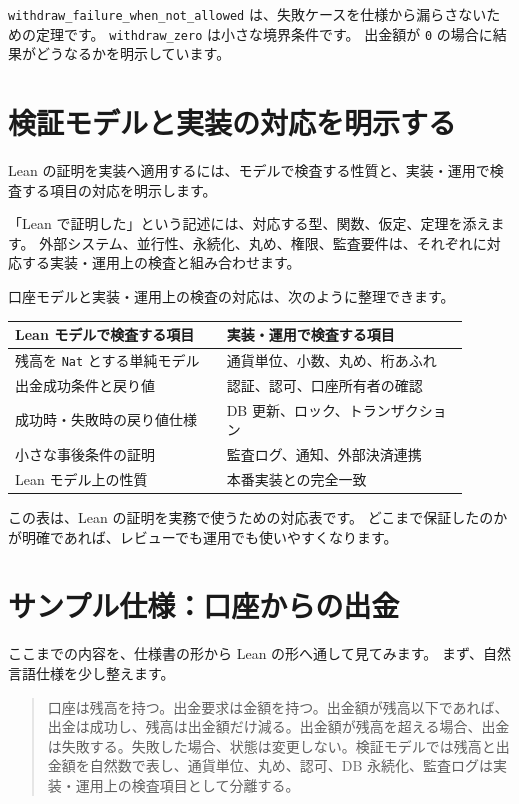 \texttt{withdraw\_failure\_when\_not\_allowed} は、失敗ケースを仕様から漏らさないための定理です。
\texttt{withdraw\_zero} は小さな境界条件です。
出金額が \texttt{0} の場合に結果がどうなるかを明示しています。

\section{検証モデルと実装の対応を明示する}

Lean の証明を実装へ適用するには、モデルで検査する性質と、実装・運用で検査する項目の対応を明示します。

「Lean で証明した」という記述には、対応する型、関数、仮定、定理を添えます。
外部システム、並行性、永続化、丸め、権限、監査要件は、それぞれに対応する実装・運用上の検査と組み合わせます。

口座モデルと実装・運用上の検査の対応は、次のように整理できます。

\begin{center}
\begin{tabular}{p{0.42\linewidth}p{0.48\linewidth}}
\toprule
Lean モデルで検査する項目 & 実装・運用で検査する項目 \\
\midrule
残高を \texttt{Nat} とする単純モデル & 通貨単位、小数、丸め、桁あふれ \\
出金成功条件と戻り値 & 認証、認可、口座所有者の確認 \\
成功時・失敗時の戻り値仕様 & DB 更新、ロック、トランザクション \\
小さな事後条件の証明 & 監査ログ、通知、外部決済連携 \\
Lean モデル上の性質 & 本番実装との完全一致 \\
\bottomrule
\end{tabular}
\end{center}

この表は、Lean の証明を実務で使うための対応表です。
どこまで保証したのかが明確であれば、レビューでも運用でも使いやすくなります。

\section{サンプル仕様：口座からの出金}

ここまでの内容を、仕様書の形から Lean の形へ通して見てみます。
まず、自然言語仕様を少し整えます。

\begin{quote}
口座は残高を持つ。出金要求は金額を持つ。出金額が残高以下であれば、出金は成功し、残高は出金額だけ減る。出金額が残高を超える場合、出金は失敗する。失敗した場合、状態は変更しない。検証モデルでは残高と出金額を自然数で表し、通貨単位、丸め、認可、DB 永続化、監査ログは実装・運用上の検査項目として分離する。
\end{quote}

